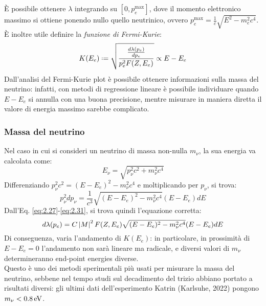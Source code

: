 È possibile ottenere $ \lambda $ integrando su $ [0, p_e^{\text{max}}] $, dove il momento elettronico massimo si ottiene ponendo nullo quello neutrinico, ovvero $ p_e^{\text{max}} = \frac{1}{c} \sqrt{E^2 - m_e^2 c^4} $.\\
È inoltre utile definire la \textit{funzione di Fermi-Kurie}:
\begin{equation}
	K(E_e) \defeq \sqrt{\frac{\frac{d\lambda(p_e)}{dp_e}}{p_e^2 F(Z,E_e)}} \propto E - E_e
	\label{eq:2.32}
\end{equation}
Dall'analisi del Fermi-Kurie plot è possibile ottenere informazioni sulla massa del neutrino: infatti, con metodi di regressione lineare è possibile individuare quando $ E - E_e $ si annulla con una buona precisione, mentre misurare in maniera diretta il valore di energia massimo sarebbe complicato.

\subsubsection{Massa del neutrino}

Nel caso in cui si consideri un neutrino di massa non-nulla $ m_{\nu} $, la sua energia va calcolata come:
\begin{equation}
	E_{\nu} = \sqrt{p_{\nu}^2 c^2 + m_{\nu}^2 c^4}
	\label{eq:2.33}
\end{equation}
Differenziando $ p_{\nu}^2 c^2 = (E - E_e)^2 - m_{\nu}^2 c^4 $ e moltiplicando per $ p_{\nu} $, si trova:
\begin{equation}
	p_{\nu}^2 dp_{\nu} = \frac{1}{c^3} \sqrt{(E - E_e)^2 - m_{\nu}^2 c^4} (E - E_e) dE
	\label{eq:2.34}
\end{equation}
Dall'Eq. \ref{eq:2.27}-\ref{eq:2.31}, si trova quindi l'equazione corretta:
\begin{equation}
	d\lambda(p_e) = C \left\lvert M\right\rvert^2 F(Z,E_e) \sqrt{(E - E_e)^2 - m_{\nu}^2 c^4} (E - E_e) dE
	\label{eq:2.35}
\end{equation}
Di conseguenza, varia l'andamento di $ K(E_e) $: in particolare, in prossimità di $ E - E_e = 0 $ l'andamento non sarà lineare ma radicale, e diversi valori di $ m_{\nu} $ determineranno end-point energies diverse.\\
Questo è uno dei metodi sperimentali più usati per misurare la massa del neutrino, sebbene nel tempo studi sul decadimento del trizio abbiano portato a risultati diversi: gli ultimi dati dell'esperimento Katrin (Karlsuhe, 2022) pongono $ m_{\nu} < 0.8 \,\mathrm{eV} $.










